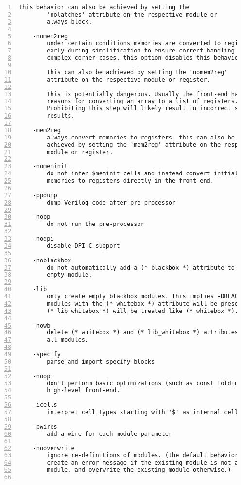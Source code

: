\begin{lstlisting}[numbers=left,frame=single]
        this behavior can also be achieved by setting the
        'nolatches' attribute on the respective module or
        always block.

    -nomem2reg
        under certain conditions memories are converted to registers
        early during simplification to ensure correct handling of
        complex corner cases. this option disables this behavior.

        this can also be achieved by setting the 'nomem2reg'
        attribute on the respective module or register.

        This is potentially dangerous. Usually the front-end has good
        reasons for converting an array to a list of registers.
        Prohibiting this step will likely result in incorrect synthesis
        results.

    -mem2reg
        always convert memories to registers. this can also be
        achieved by setting the 'mem2reg' attribute on the respective
        module or register.

    -nomeminit
        do not infer $meminit cells and instead convert initialized
        memories to registers directly in the front-end.

    -ppdump
        dump Verilog code after pre-processor

    -nopp
        do not run the pre-processor

    -nodpi
        disable DPI-C support

    -noblackbox
        do not automatically add a (* blackbox *) attribute to an
        empty module.

    -lib
        only create empty blackbox modules. This implies -DBLACKBOX.
        modules with the (* whitebox *) attribute will be preserved.
        (* lib_whitebox *) will be treated like (* whitebox *).

    -nowb
        delete (* whitebox *) and (* lib_whitebox *) attributes from
        all modules.

    -specify
        parse and import specify blocks

    -noopt
        don't perform basic optimizations (such as const folding) in the
        high-level front-end.

    -icells
        interpret cell types starting with '$' as internal cell types

    -pwires
        add a wire for each module parameter

    -nooverwrite
        ignore re-definitions of modules. (the default behavior is to
        create an error message if the existing module is not a black box
        module, and overwrite the existing module otherwise.)


\end{lstlisting}
